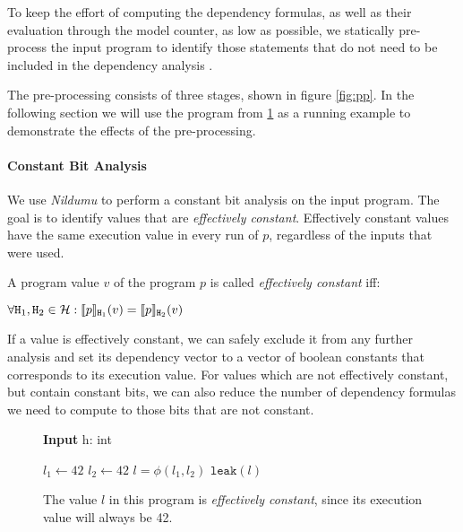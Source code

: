 To keep the effort of computing the dependency formulas, as well as their evaluation through the model counter, as low as possible, we statically pre-process the input program to identify those statements that do not need to be included in the dependency analysis .

The pre-processing consists of three stages, shown in figure \ref{fig:pp}. In the following section we will use the program from \ref{fig:ec} as a running example to demonstrate the effects of the pre-processing.

\paragraph{Constant Bit Analysis}
We use \emph{Nildumu} \cite{bechberger18} to perform a constant bit analysis on the input program. The goal is to identify values that are \emph{effectively constant}. Effectively constant values have the same execution value in every run of $p$, regardless of the inputs that were used.

\begin{definition}
    A program value $v$ of the program $p$ is called \emph{effectively constant} iff:
    \begin{center}
        $\forall \mathtt{H}_1, \mathtt{H}_2 \in \mathcal{H}: \llbracket p \rrbracket_{\mathtt{H}_1} (v) = \llbracket p \rrbracket_{\mathtt{H}_2}(v)$
    \end{center}
\end{definition}

If a value is effectively constant, we can safely exclude it from any further analysis and set its dependency vector to a vector of boolean constants that corresponds to its execution value. For values which are not effectively constant, but contain constant bits, we can also reduce the number of dependency formulas we need to compute to those bits that are not constant.


\begin{figure}
    \centering
    \begin{minipage}{.7\linewidth}
        \begin{algorithm}[H]
            \hspace*{\algorithmicindent} \textbf{Input} h: int \\
            \hspace{1em}
            \begin{algorithmic}[1]
                \State $l_1 \leftarrow 42$
                \Else
                \State $l_2 \leftarrow 42$
                \EndIf
                \State $l = \phi(l_1, l_2)$
                \State $\mathtt{leak}(l)$
            \end{algorithmic}
        \end{algorithm}
    \end{minipage}
    \caption{The value $l$ in this program is \emph{effectively constant}, since its execution value will always be 42.}
    \label{fig:ec}
\end{figure}

